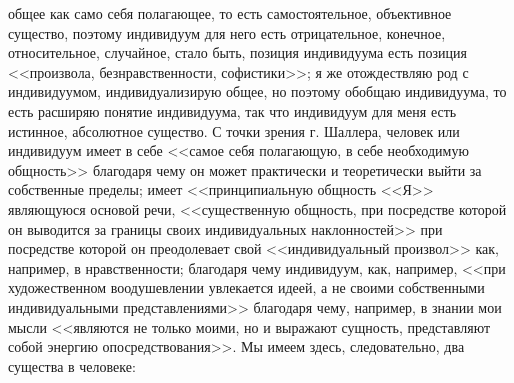 \documentclass[12pt]{article}
\begin{document}
общее как само себя полагающее, то есть самостоятельное, объективное существо, поэтому индивидуум для него есть отрицательное, конечное, относительное, случайное, стало быть, позиция индивидуума есть позиция <<произвола, безнравственности, софистики>>; я же отождествляю род с индивидуумом, индивидуализирую общее, но поэтому обобщаю индивидуума, то есть расширяю понятие индивидуума, так что индивидуум для меня есть истинное, абсолютное существо. С точки зрения г. Шаллера, человек или индивидуум имеет в себе <<самое себя полагающую, в себе необходимую общность>>  благодаря чему он может практически и теоретически выйти за собственные пределы; имеет <<принципиальную общность <<Я>>  являющуюся основой речи, <<существенную общность, при посредстве которой он выводится за границы своих индивидуальных наклонностей>>  при посредстве которой он преодолевает свой <<индивидуальный произвол>>  как, например, в нравственности; благодаря чему индивидуум, как, например, <<при художественном воодушевлении увлекается идеей, а не своими собственными индивидуальными представлениями>>  благодаря чему, например, в знании мои мысли <<являются не только моими, но и выражают сущность, представляют собой энергию опосредствования>>. Мы имеем здесь, следовательно, два существа в человеке: 
\end{document}
